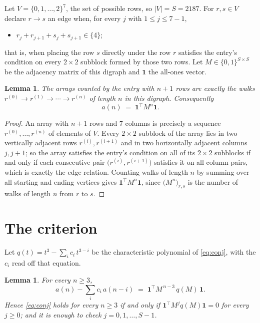 \documentclass[11pt,a4paper]{article}
\theoremstyle{plain}
\newtheorem{lemma}[theorem]{Lemma}
\theoremstyle{definition}
\begin{document}
Let $V=\{0,1,\dots,2\}^{7}$, the set of possible rows, so $|V|=S=2187$. For
$r,s\in V$ declare $r\to s$ an edge when, for every $j$ with $1\le j\le 7-1$,
\begin{itemize}
\item $r_j+r_{j+1}+s_j+s_{j+1}\in\{4\}$;

\end{itemize}
that is, when placing the row $s$ directly under the row $r$ satisfies the entry's
condition on every $2\times2$ subblock formed by those two rows. Let $M\in\{0,1\}^{S\times
S}$ be the adjacency matrix of this digraph and $\mathbf{1}$ the all-ones vector.

\begin{lemma}\label{lem:walk}
The arrays counted by the entry with $n+1$ rows are exactly the walks
$r^{(0)}\to r^{(1)}\to\cdots\to r^{(n)}$ of length $n$ in this digraph. Consequently
\[
a(n)\;=\;\mathbf{1}^{\!\top}M^{n}\mathbf{1} .
\]
\end{lemma}

\begin{proof}
An array with $n+1$ rows and $7$ columns is precisely a sequence
$r^{(0)},\dots,r^{(n)}$ of elements of $V$. Every $2\times2$ subblock of the array lies
in two vertically adjacent rows $r^{(i)},r^{(i+1)}$ and in two horizontally adjacent
columns $j,j+1$; so the array satisfies the entry's condition on all of its $2\times2$
subblocks if and only if each consecutive pair $\bigl(r^{(i)},r^{(i+1)}\bigr)$ satisfies
it on all column pairs, which is exactly the edge relation. Counting walks of length $n$ by
summing over all starting and ending vertices gives
$\mathbf{1}^{\!\top}M^{n}\mathbf{1}$, since
$\bigl(M^{n}\bigr)_{r,s}$ is the number of walks of length $n$ from $r$ to $s$.
\end{proof}

\section{The criterion}

Let $q(t)=t^{3}-\sum_{i}c_i\,t^{3-i}$ be the characteristic polynomial of
\eqref{eq:conj}, with the $c_i$ read off that equation.

\begin{lemma}\label{lem:crit}
For every $n\ge3$,
\[
a(n)-\sum_i c_i\,a(n-i)\;=\;\mathbf{1}^{\!\top}M^{\,n-3}\,q(M)\,\mathbf{1} .
\]
Hence \eqref{eq:conj} holds for every $n\ge3$ if and only if
$\mathbf{1}^{\!\top}M^{j}q(M)\mathbf{1}=0$ for every $j\ge0$; and it is enough to
check $j=0,1,\dots,S-1$.
\end{lemma}
\end{document}

